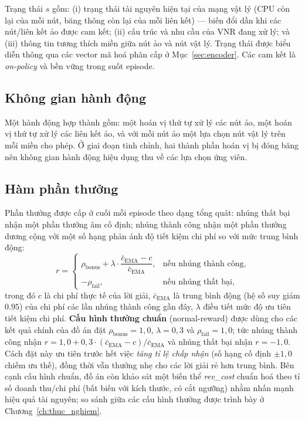 \documentclass[../DoAn.tex]{subfiles}
\begin{document}
Trạng thái $s$ gồm: (i) trạng thái tài nguyên hiện tại của mạng vật lý (CPU còn lại của mỗi nút, băng thông còn lại của mỗi liên kết) — biến đổi dần khi các nút/liên kết ảo được cam kết; (ii) cấu trúc và nhu cầu của VNR đang xử lý; và (iii) thông tin tương thích miền giữa nút ảo và nút vật lý. Trạng thái được biểu diễn thông qua các vector mã hoá phân cấp ở Mục~\ref{sec:encoder}. Các cam kết là \textit{on-policy} và bền vững trong suốt episode.

\subsection{Không gian hành động}
\label{subsec:env-action}

Một hành động hợp thành gồm: một hoán vị thứ tự xử lý các nút ảo, một hoán vị thứ tự xử lý các liên kết ảo, và với mỗi nút ảo một lựa chọn nút vật lý trên mỗi miền cho phép. Ở giai đoạn tinh chỉnh, hai thành phần hoán vị bị đóng băng nên không gian hành động hiệu dụng thu về các lựa chọn ứng viên.

\subsection{Hàm phần thưởng}
\label{subsec:env-reward}

Phần thưởng được cấp ở cuối mỗi episode theo dạng tổng quát: nhúng thất bại nhận một phần thưởng âm cố định; nhúng thành công nhận một phần thưởng dương cộng với một số hạng phản ánh độ tiết kiệm chi phí so với mức trung bình động:
\begin{equation}
    r =
    \begin{cases}
        \rho_{\text{bonus}} + \lambda \cdot \dfrac{\bar{c}_{\text{EMA}} - c}{\bar{c}_{\text{EMA}}}, & \text{nếu nhúng thành công},\\[2mm]
        -\rho_{\text{fail}}, & \text{nếu nhúng thất bại},
    \end{cases}
    \label{eq:reward}
\end{equation}
trong đó $c$ là chi phí thực tế của lời giải, $\bar{c}_{\text{EMA}}$ là trung bình động (hệ số suy giảm $0.95$) của chi phí các lần nhúng thành công gần đây, $\lambda$ điều tiết mức độ ưu tiên tiết kiệm chi phí. \textbf{Cấu hình thưởng chuẩn} (normal-reward) được dùng cho các kết quả chính của đồ án đặt $\rho_{\text{bonus}}=1{,}0$, $\lambda=0{,}3$ và $\rho_{\text{fail}}=1{,}0$; tức nhúng thành công nhận $r = 1{,}0 + 0{,}3\cdot(\bar{c}_{\text{EMA}}-c)/\bar{c}_{\text{EMA}}$ và nhúng thất bại nhận $r = -1{,}0$. Cách đặt này ưu tiên trước hết việc \textit{tăng tỉ lệ chấp nhận} (số hạng cố định $\pm1{,}0$ chiếm ưu thế), đồng thời vẫn thưởng nhẹ cho các lời giải rẻ hơn trung bình. Bên cạnh cấu hình chuẩn, đồ án còn khảo sát một biến thể \textit{rev\_cost} chuẩn hoá theo tỉ số doanh thu/chi phí (bất biến với kích thước, có cắt ngưỡng) nhằm nhấn mạnh hiệu quả tài nguyên; so sánh giữa các cấu hình thưởng được trình bày ở Chương~\ref{ch:thuc_nghiem}.
\end{document}
